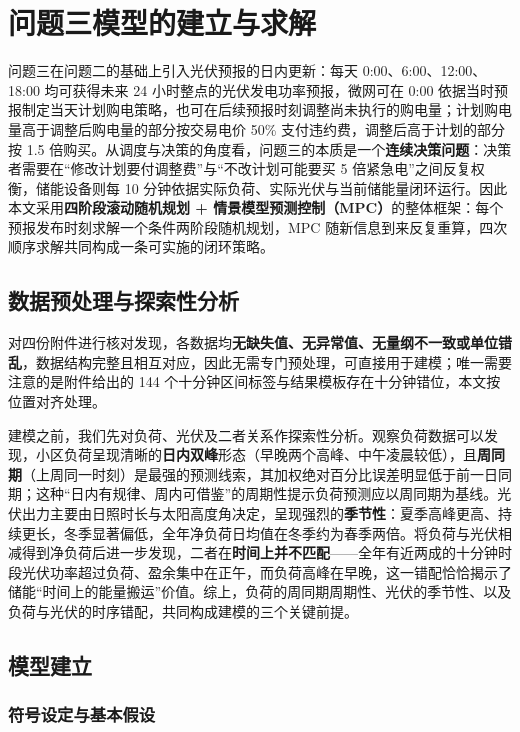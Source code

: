 \section{问题三模型的建立与求解}

问题三在问题二的基础上引入光伏预报的日内更新：每天 0:00、6:00、12:00、18:00 均可获得未来 24 小时整点的光伏发电功率预报，微网可在 0:00 依据当时预报制定当天计划购电策略，也可在后续预报时刻调整尚未执行的购电量；计划购电量高于调整后购电量的部分按交易电价 50\% 支付违约费，调整后高于计划的部分按 1.5 倍购买。从调度与决策的角度看，问题三的本质是一个\textbf{连续决策问题}：决策者需要在“修改计划要付调整费”与“不改计划可能要买 5 倍紧急电”之间反复权衡，储能设备则每 10 分钟依据实际负荷、实际光伏与当前储能量闭环运行。因此本文采用\textbf{四阶段滚动随机规划 + 情景模型预测控制（MPC）}的整体框架：每个预报发布时刻求解一个条件两阶段随机规划，MPC 随新信息到来反复重算，四次顺序求解共同构成一条可实施的闭环策略。

\subsection{数据预处理与探索性分析}

对四份附件进行核对发现，各数据均\textbf{无缺失值、无异常值、无量纲不一致或单位错乱}，数据结构完整且相互对应，因此无需专门预处理，可直接用于建模；唯一需要注意的是附件给出的 144 个十分钟区间标签与结果模板存在十分钟错位，本文按位置对齐处理。

建模之前，我们先对负荷、光伏及二者关系作探索性分析。观察负荷数据可以发现，小区负荷呈现清晰的\textbf{日内双峰}形态（早晚两个高峰、中午凌晨较低），且\textbf{周同期}（上周同一时刻）是最强的预测线索，其加权绝对百分比误差明显低于前一日同期；这种“日内有规律、周内可借鉴”的周期性提示负荷预测应以周同期为基线。光伏出力主要由日照时长与太阳高度角决定，呈现强烈的\textbf{季节性}：夏季高峰更高、持续更长，冬季显著偏低，全年净负荷日均值在冬季约为春季两倍。将负荷与光伏相减得到净负荷后进一步发现，二者在\textbf{时间上并不匹配}——全年有近两成的十分钟时段光伏功率超过负荷、盈余集中在正午，而负荷高峰在早晚，这一错配恰恰揭示了储能“时间上的能量搬运”价值。综上，负荷的周同期周期性、光伏的季节性、以及负荷与光伏的时序错配，共同构成建模的三个关键前提。

\subsection{模型建立}

\subsubsection{符号设定与基本假设}

